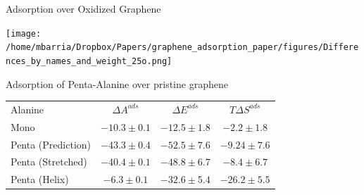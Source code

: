 \documentclass[aspectratio=169, compress]{beamer}
\begin{document}
\begin{frame}{Adsorption over Oxidized Graphene}
\centerline{\texttt{[image: /home/mbarria/Dropbox/Papers/graphene\_adsorption\_paper/figures/Differences\_by\_names\_and\_weight\_25o.png]}}
\end{frame}

\begin{frame}{Adsorption of Penta-Alanine over pristine graphene}
\centering
\begin{tabular}{lccc}
\toprule
Alanine & $\Delta A^{ads}$ & $\Delta E^{ads}$ & $T \Delta S^{ads}$ \\
Mono & $ -10.3 \pm 0.1 $ & $ -12.5 \pm 1.8 $ & $ -2.2 \pm 1.8 $ \\
Penta (Prediction) & $ -43.3 \pm 0.4 $ & $ -52.5 \pm 7.6 $ & $ -9.24 \pm 7.6$ \\
Penta (Stretched) & $ -40.4 \pm 0.1 $ & $ -48.8 \pm 6.7 $ & $ -8.4 \pm 6.7 $ \\
Penta (Helix) & $ -6.3 \pm 0.1 $ & $ -32.6 \pm 5.4 $ & $ -26.2 \pm 5.5 $ \\
\bottomrule
\end{tabular}
\end{frame}
\end{document}
